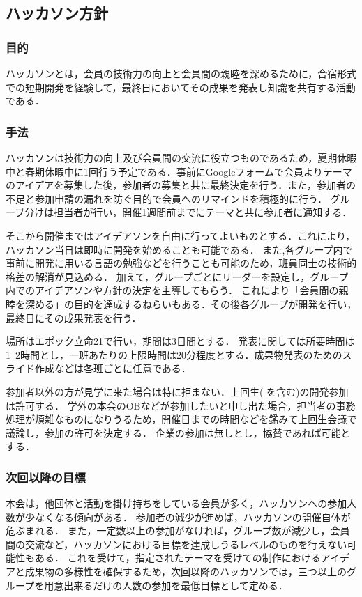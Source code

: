 \subsection*{ハッカソン方針}

\subsubsection*{目的}
ハッカソンとは，会員の技術力の向上と会員間の親睦を深めるために，合宿形式での短期開発を経験して，最終日においてその成果を発表し知識を共有する活動である．


\subsubsection*{手法}
ハッカソンは技術力の向上及び会員間の交流に役立つものであるため，夏期休暇中と春期休暇中に1回行う予定である．事前にGoogleフォームで会員よりテーマのアイデアを募集した後，参加者の募集と共に最終決定を行う．また，参加者の不足と参加申請の漏れを防ぐ目的で会員へのリマインドを積極的に行う．
グループ分けは担当者が行い，開催1週間前までにテーマと共に参加者に通知する．

そこから開催まではアイデアソンを自由に行ってよいものとする．これにより，ハッカソン当日は即時に開発を始めることも可能である．
また,各グループ内で事前に開発に用いる言語の勉強などを行うことも可能のため，班員同士の技術的格差の解消が見込める．
加えて，グループごとにリーダーを設定し，グループ内でのアイデアソンや方針の決定を主導してもらう．
これにより「会員間の親睦を深める」の目的を達成するねらいもある．その後各グループが開発を行い，最終日にその成果発表を行う．

場所はエポック立命21で行い，期間は3日間とする．
発表に関しては所要時間は1~2時間とし，一班あたりの上限時間は20分程度とする．成果物発表のためのスライド作成などは各班ごとに任意である．

参加者以外の方が見学に来た場合は特に拒まない．上回生(\fourthGrade{} を含む)の開発参加は許可する．
学外の本会のOBなどが参加したいと申し出た場合，担当者の事務処理が煩雑なものになりうるため，開催日までの時間などを鑑みて上回生会議で議論し，参加の許可を決定する．
企業の参加は無しとし，協賛であれば可能とする．



\subsubsection*{次回以降の目標}
本会は，他団体と活動を掛け持ちをしている会員が多く，ハッカソンへの参加人数が少なくなる傾向がある．
参加者の減少が進めば，ハッカソンの開催自体が危ぶまれる．
また，一定数以上の参加がなければ，グループ数が減少し，会員間の交流など，ハッカソンにおける目標を達成しうるレベルのものを行えない可能性もある．
これを受けて，指定されたテーマを受けての制作におけるアイデアと成果物の多様性を確保するため，次回以降のハッカソンでは，三つ以上のグループを用意出来るだけの人数の参加を最低目標として定める．

